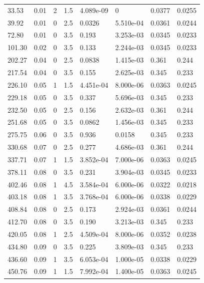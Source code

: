 \documentclass[preview]{standalone}
\begin{document}
{{\begin{tabular}{L{1.2cm}C{1.2cm} C{0.3cm}C{0.5cm} C{1.4cm}C{1.4cm} C{1.4cm}C{1.4cm}}
  33.53  &  0.01  & 2     & 1.5 &  4.089e-09  & 0  & 0.0377 &  0.0255   \\ 
  39.92  &  0.01  & 0     & 2.5 &  0.0326  & 5.510e-04  & 0.0361 &  0.0244   \\ 
  72.80  &  0.01  & 0     & 3.5 &  0.193  & 3.253e-03  & 0.0345 &  0.0233   \\ 
  101.30  &  0.02  & 0     & 3.5 &  0.133  & 2.244e-03  & 0.0345 &  0.0233   \\ 
  202.27  &  0.04  & 0     & 2.5 &  0.0838  & 1.415e-03  & 0.361 &  0.244   \\ 
  217.54  &  0.04  & 0     & 3.5 &  0.155  & 2.625e-03  & 0.345 &  0.233   \\ 
  226.10  &  0.05  & 1     & 1.5 &  4.451e-04  & 8.000e-06  & 0.0363 &  0.0245   \\ 
  229.18  &  0.05  & 0     & 3.5 &  0.337  & 5.696e-03  & 0.345 &  0.233   \\ 
  232.50  &  0.05  & 0     & 2.5 &  0.156  & 2.632e-03  & 0.361 &  0.244   \\ 
  251.68  &  0.05  & 0     & 3.5 &  0.0862  & 1.456e-03  & 0.345 &  0.233   \\ 
  275.75  &  0.06  & 0     & 3.5 &  0.936  & 0.0158  & 0.345 &  0.233   \\ 
  330.68  &  0.07  & 0     & 2.5 &  0.277  & 4.686e-03  & 0.361 &  0.244   \\ 
  337.71  &  0.07  & 1     & 1.5 &  3.852e-04  & 7.000e-06  & 0.0363 &  0.0245   \\ 
  378.11  &  0.08  & 0     & 3.5 &  0.231  & 3.904e-03  & 0.0345 &  0.0233   \\ 
  402.46  &  0.08  & 1     & 4.5 &  3.584e-04  & 6.000e-06  & 0.0322 &  0.0218   \\ 
  403.18  &  0.08  & 1     & 3.5 &  3.768e-04  & 6.000e-06  & 0.0338 &  0.0229   \\ 
  408.84  &  0.08  & 0     & 2.5 &  0.173  & 2.924e-03  & 0.0361 &  0.0244   \\ 
  412.70  &  0.08  & 0     & 3.5 &  0.190  & 3.213e-03  & 0.345 &  0.233   \\ 
  420.05  &  0.08  & 1     & 2.5 &  4.509e-04  & 8.000e-06  & 0.0352 &  0.0238   \\ 
  434.80  &  0.09  & 0     & 3.5 &  0.225  & 3.809e-03  & 0.345 &  0.233   \\ 
  436.60  &  0.09  & 1     & 3.5 &  6.053e-04  & 1.000e-05  & 0.0338 &  0.0229   \\ 
  450.76  &  0.09  & 1     & 1.5 &  7.992e-04  & 1.400e-05  & 0.0363 &  0.0245   \\ 

\end{tabular}}}
\end{document}
